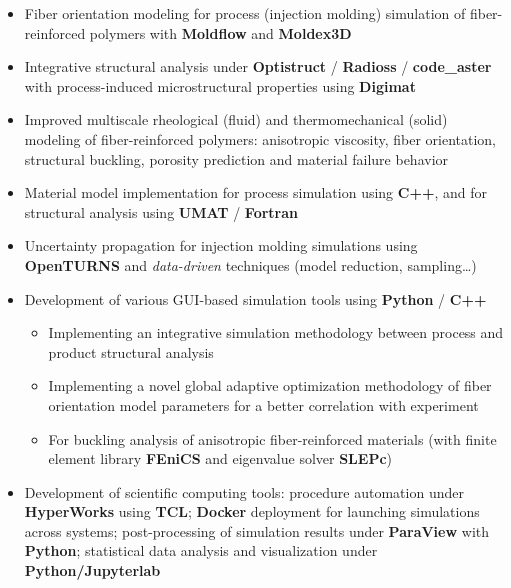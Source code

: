 \documentclass[10pt,a4paper]{altacv}
\begin{document}
\begin{itemize}
\item Fiber orientation modeling for process (injection molding) simulation of fiber-reinforced polymers with \textbf{Moldflow} and \textbf{Moldex3D}
\item Integrative structural analysis under \textbf{Optistruct} / \textbf{Radioss} / \textbf{code\_aster} with process-induced microstructural properties using \textbf{Digimat}
\item Improved multiscale rheological (fluid) and thermomechanical (solid) modeling of fiber-reinforced polymers: anisotropic viscosity, fiber orientation, structural buckling, porosity prediction and material failure behavior
\item Material model implementation for process simulation using \textbf{C++}, and for structural analysis using \textbf{UMAT} / \textbf{Fortran}
\item Uncertainty propagation for injection molding simulations using \textbf{OpenTURNS} and \emph{data-driven} techniques (model reduction, sampling\ldots)
\item Development of various GUI-based simulation tools using \textbf{Python} / \textbf{C++}
  \begin{itemize}
    \item Implementing an integrative simulation methodology between process and product structural analysis
    \item Implementing a novel global adaptive optimization methodology of fiber orientation model parameters for a better correlation with experiment
    \item For buckling analysis of anisotropic fiber-reinforced materials (with finite element library \textbf{FEniCS} and eigenvalue solver \textbf{SLEPc})
  \end{itemize}
\item Development of scientific computing tools: procedure automation under \textbf{HyperWorks} using \textbf{TCL}; \textbf{Docker} deployment for launching simulations across systems; post-processing of simulation results under \textbf{ParaView} with \textbf{Python}; statistical data analysis and visualization under \textbf{Python/Jupyterlab}
\end{itemize}
\end{document}
